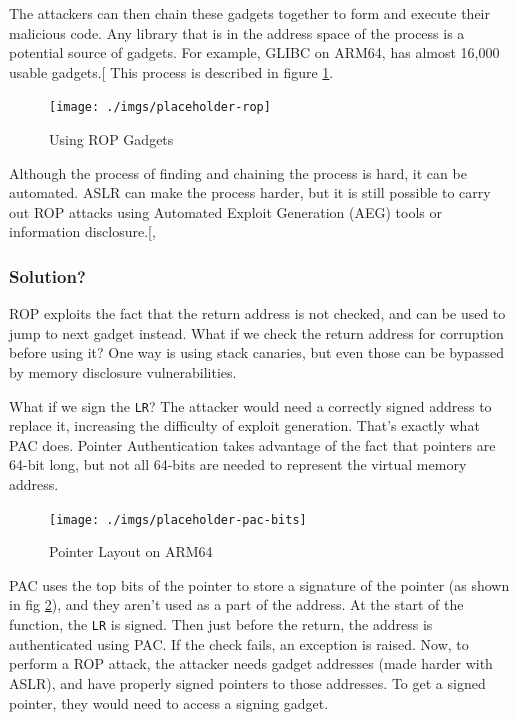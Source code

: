 \documentclass[a4paper, nobind]{templates/ociamthesis}
\begin{document}
The attackers can then chain these gadgets together to form and execute their malicious code.
Any library that is in the address space of the process is a potential source of gadgets.
For example, GLIBC on ARM64, has almost 16,000 usable gadgets.{[}\citeproc{ref-riscyrop}{10}{]}
This process is described in figure \ref{fig:rop-diag}.

\begin{figure}

{\centering \texttt{[image: ./imgs/placeholder-rop]} 

}

\caption{Using ROP Gadgets}\label{fig:rop-diag}
\end{figure}

Although the process of finding and chaining the process is hard, it can be automated.
ASLR can make the process harder, but it is still possible to carry out ROP attacks using
Automated Exploit Generation (AEG) tools or information disclosure.{[}, \citeproc{ref-riscyrop}{10}{]}

\subsubsection{Solution?}\label{solution}

ROP exploits the fact that the return address is not checked, and can be used to
jump to next gadget instead. What if we check the return address for corruption
before using it? One way is using stack canaries, but even those can be bypassed
by memory disclosure vulnerabilities.

What if we sign the \texttt{LR}? The attacker would need a correctly signed address to replace it,
increasing the difficulty of exploit generation.
That's exactly what PAC does. Pointer Authentication
takes advantage of the fact that pointers are 64-bit long, but not all 64-bits
are needed to represent the virtual memory address.

\begin{figure}

{\centering \texttt{[image: ./imgs/placeholder-pac-bits]} 

}

\caption{Pointer Layout on ARM64}\label{fig:pac-bits}
\end{figure}

PAC uses the top bits of the pointer to store a signature of the pointer
(as shown in fig \ref{fig:pac-bits}), and they aren't
used as a part of the address. At the start of the function, the \texttt{LR} is signed.
Then just before the return, the address is authenticated using PAC. If the check fails,
an exception is raised. Now, to perform a ROP attack, the attacker needs gadget addresses
(made harder with ASLR), and have properly signed pointers to those addresses.
To get a signed pointer, they would need to access a signing gadget.
\end{document}
